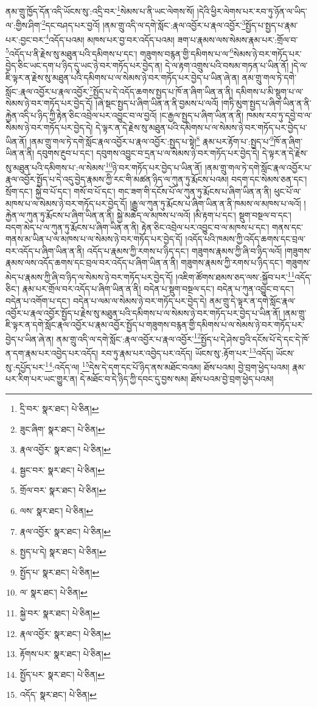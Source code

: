 ནམ་གྲུ་ཁྱོད་དོན་འདི་ཡོངས་སུ་:འདྲི་བར་\footnote{དྲི་བར་  སྣར་ཐང་།  པེ་ཅིན། }སེམས་པ་ནི་ཡང་ལེགས་སོ། །དེའི་ཕྱིར་ལེགས་པར་རབ་ཏུ་ཉོན་ལ་ཡིད་ལ་:གྱིས་ཤིག་\footnote{ཟུང་ཞིག་  སྣར་ཐང་།  པེ་ཅིན། }དང་བཤད་པར་བྱའོ། །ནམ་གྲུ་འདི་ལ་དགེ་སློང་:རྣལ་འབྱོར་པ་རྣལ་འབྱོར་\footnote{རྣལ་འབྱོར་  སྣར་ཐང་།  པེ་ཅིན། }སྤྱོད་པ་སྤྱད་པ་རྣམ་པར་:བྱང་བར་\footnote{སྦྱང་བར་  སྣར་ཐང་།  པེ་ཅིན། }འདོད་པའམ། མཁས་པར་བྱ་བར་འདོད་པའམ། ཟག་པ་རྣམས་ལས་སེམས་རྣམ་པར་:གྲོལ་བ་\footnote{གྲོལ་བར་  སྣར་ཐང་།  པེ་ཅིན། }འདོད་པ་ནི་རྗེས་སུ་མཐུན་པའི་དམིགས་པ་དང་། གཟུགས་བརྙན་གྱི་དམིགས་པ་ལ་\footnote{ལས་  སྣར་ཐང་།  པེ་ཅིན། }སེམས་ཉེ་བར་གཏོད་པར་བྱེད་ཅིང་ཡང་དག་པ་ཉིད་དུ་ཡང་ཉེ་བར་གཏོད་པར་བྱེད་ན། དེ་ལ་རྟག་འགྲུས་པའི་བསམ་གཏན་པ་ཡིན་ནོ། །དེ་ལ་ཇི་ལྟར་ན་རྗེས་སུ་མཐུན་པའི་དམིགས་པ་ལ་སེམས་ཉེ་བར་གཏོད་པར་བྱེད་པ་ཡིན་ཞེ་ན། ནམ་གྲུ་གལ་ཏེ་དགེ་སློང་:རྣལ་འབྱོར་པ་རྣལ་འབྱོར་\footnote{རྣལ་འབྱོར་  སྣར་ཐང་།  པེ་ཅིན། }སྤྱོད་པ་དེ་འདོད་ཆགས་སྤྱད་པ་ཁོ་ན་ཞིག་ཡིན་ན་ནི། དམིགས་པ་མི་སྡུག་པ་ལ་སེམས་ཉེ་བར་གཏོད་པར་བྱེད་དོ། །ཞེ་སྡང་སྤྱད་པ་ཞིག་ཡིན་ན་ནི་བྱམས་པ་ལའོ། །གཏི་མུག་སྤྱད་པ་ཞིག་ཡིན་ན་ནི་རྐྱེན་འདི་པ་ཉིད་ཀྱི་རྟེན་ཅིང་འབྲེལ་པར་འབྱུང་བ་ལ་བྱའོ། །ང་རྒྱལ་སྤྱད་པ་ཞིག་ཡིན་ན་ནི། ཁམས་རབ་ཏུ་དབྱེ་བ་ལ་སེམས་ཉེ་བར་གཏོད་པར་བྱེད་དེ། དེ་ལྟར་ན་དེ་རྗེས་སུ་མཐུན་པའི་དམིགས་པ་ལ་སེམས་ཉེ་བར་གཏོད་པར་བྱེད་པ་ཡིན་ནོ། །ནམ་གྲུ་གལ་ཏེ་དགེ་སློང་རྣལ་འབྱོར་པ་རྣལ་འབྱོར་:སྤྱད་པ་སྟེ།\footnote{སྤྱད་པ་དེ།  སྣར་ཐང་།  པེ་ཅིན། } རྣམ་པར་རྟོག་པ་:སྤྱད་པ་\footnote{སྤྱོད་པ་  སྣར་ཐང་།  པེ་ཅིན། }ཁོ་ན་ཞིག་ཡིན་ན་ནི། དབུགས་རྔུབ་པ་དང་། དབུགས་འབྱུང་བ་དྲན་པ་ལ་སེམས་ཉེ་བར་གཏོད་པར་བྱེད་དེ། དེ་ལྟར་ན་དེ་རྗེས་སུ་མཐུན་པའི་དམིགས་པ་:ལ་སེམས་\footnote{ལ་  སྣར་ཐང་།  པེ་ཅིན། }ཉེ་བར་གཏོད་པར་བྱེད་པ་ཡིན་ནོ། །ནམ་གྲུ་གལ་ཏེ་དགེ་སློང་རྣལ་འབྱོར་པ་རྣལ་འབྱོར་སྤྱོད་པ་དེ་འདུ་བྱེད་རྣམས་ཀྱི་རང་གི་མཚན་ཉིད་ལ་ཀུན་ཏུ་རྨོངས་པའམ། བདག་དང་སེམས་ཅན་དང་། སྲོག་དང་། སྐྱེ་བ་པོ་དང་། གསོ་བ་པོ་དང་། གང་ཟག་གི་དངོས་པོ་ལ་ཀུན་ཏུ་རྨོངས་པ་ཞིག་ཡིན་ན་ནི། ཕུང་པོ་ལ་མཁས་པ་ལ་སེམས་ཉེ་བར་གཏོད་པར་བྱེད་དོ། །རྒྱུ་ལ་ཀུན་ཏུ་རྨོངས་པ་ཞིག་ཡིན་ན་ནི་ཁམས་ལ་མཁས་པ་ལའོ། །རྐྱེན་ལ་ཀུན་ཏུ་རྨོངས་པ་ཞིག་ཡིན་ན་ནི། སྐྱེ་མཆེད་ལ་མཁས་པ་ལའོ། །མི་རྟག་པ་དང་། སྡུག་བསྔལ་བ་དང་། བདག་མེད་པ་ལ་ཀུན་ཏུ་རྨོངས་པ་ཞིག་ཡིན་ན་ནི། རྟེན་ཅིང་འབྲེལ་པར་འབྱུང་བ་ལ་མཁས་པ་དང་། གནས་དང་གནས་མ་ཡིན་པ་ལ་མཁས་པ་ལ་སེམས་ཉེ་བར་གཏོད་པར་བྱེད་དོ། །འདོད་པའི་ཁམས་ཀྱི་འདོད་ཆགས་དང་བྲལ་བར་འདོད་པ་ཞིག་ཡིན་ན་ནི། འདོད་པ་རྣམས་ཀྱི་རགས་པ་ཉིད་དང་། གཟུགས་རྣམས་ཀྱི་ཞི་བ་ཉིད་ལའོ། །གཟུགས་རྣམས་ལས་འདོད་ཆགས་དང་བྲལ་བར་འདོད་པ་ཞིག་ཡིན་ན་ནི། གཟུགས་རྣམས་ཀྱི་རགས་པ་ཉིད་དང་། གཟུགས་མེད་པ་རྣམས་ཀྱི་ཞི་བ་ཉིད་ལ་སེམས་ཉེ་བར་གཏོད་པར་བྱེད་དོ། །འཇིག་ཚོགས་ཐམས་ཅད་ལས་:སྐྱོབ་པར་\footnote{སྐྱེ་བར་  སྣར་ཐང་།  པེ་ཅིན། }འདོད་ཅིང་། རྣམ་པར་གྲོལ་བར་འདོད་པ་ཞིག་ཡིན་ན་ནི། བདེན་པ་སྡུག་བསྔལ་དང་། བདེན་པ་ཀུན་འབྱུང་བ་དང་། བདེན་པ་འགོག་པ་དང་། བདེན་པ་ལམ་ལ་སེམས་ཉེ་བར་གཏོད་པར་བྱེད་དེ། ནམ་གྲུ་དེ་ལྟར་ན་དགེ་སློང་རྣལ་འབྱོར་པ་རྣལ་འབྱོར་སྤྱོད་པ་རྗེས་སུ་མཐུན་པའི་དམིགས་པ་ལ་སེམས་ཉེ་བར་གཏོད་པར་བྱེད་པ་ཡིན་ནོ། །ནམ་གྲུ་ཇི་ལྟར་ན་དགེ་སློང་རྣལ་འབྱོར་པ་རྣམ་འབྱོར་སྤྱོད་པ་གཟུགས་བརྙན་གྱི་དམིགས་པ་ལ་སེམས་ཉེ་བར་གཏོད་པར་བྱེད་པ་ཡིན་ཞེ་ན། ནམ་གྲུ་འདི་ལ་དགེ་སློང་:རྣལ་འབྱོར་པ་རྣལ་འབྱོར་\footnote{རྣལ་འབྱོར་  སྣར་ཐང་།  པེ་ཅིན། }སྤྱོད་པ་དེ་ཤེས་བྱའི་དངོས་པོ་དེ་དང་དེ་ཁོ་ན་དག་རྣམ་པར་འབྱེད་པར་འདོད། རབ་ཏུ་རྣམ་པར་འབྱེད་པར་འདོད། ཡོངས་སུ་:རྟོག་པར་\footnote{རྟོགས་པར་  སྣར་ཐང་།  པེ་ཅིན། }འདོད། ཡོངས་སུ་:དཔྱོད་པར་\footnote{སྤྱོད་པར་  སྣར་ཐང་།  པེ་ཅིན། }:འདོད་ལ། \footnote{འདོད་  སྣར་ཐང་།  པེ་ཅིན། }དེས་དེ་དག་དང་པོ་ཉིད་ནས་མཐོང་བའམ། ཐོས་པའམ། བྱེ་བྲག་ཕྱེད་པའམ། རྣམ་པར་རིག་པར་ཡང་གྱུར་ན། དེ་མཐོང་བ་དེ་ཉིད་ཀྱི་དབང་དུ་བྱས་སམ། ཐོས་པའམ་བྱེ་བྲག་ཕྱེད་པའམ། 